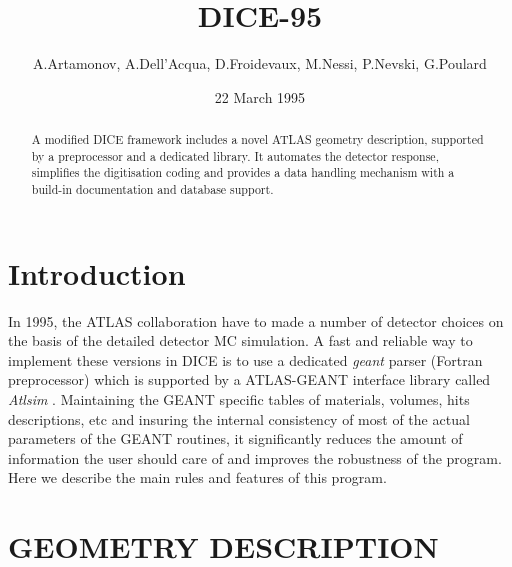 \setlength{\unitlength}{1cm}
\newcommand  {\g}  {{\it geant     }}
\newcommand  {\as} {{\it Atlsim    }}
\newcommand  {\asi} {{\it Atlsim } interface }
\newcommand  {\s}  {$ \Rightarrow $}
\newcommand  {\p}  {\put}
\newcommand  {\mup}{\multiput}
\newcommand  {\f}  {\framebox}
\newcommand  {\m}  {\makebox}
\renewcommand{\l}  {\line}
\renewcommand{\v}  {\vector}
\newcommand  {\bp} {\begin{picture}}
\newcommand  {\ep} {\end{picture}}


 
\date{22 March 1995}
\title{DICE-95}
\author{A.Artamonov, A.Dell'Acqua, D.Froidevaux, M.Nessi, P.Nevski, G.Poulard}
\maketitle
 
\begin{abstract}
A modified DICE framework 
includes a novel ATLAS geometry description, 
supported by a preprocessor and a dedicated library.
It automates the detector response,
simplifies the digitisation coding 
and provides a data handling mechanism 
with a build-in documentation and database support.
\end{abstract}
 

\section{Introduction}
 
 In 1995, the ATLAS collaboration have to made 
a number of detector choices on the basis of  
the detailed detector MC simulation.
  A fast and reliable way to implement these versions in DICE
is to use a dedicated \g parser (Fortran preprocessor) 
which is supported by a
ATLAS-GEANT interface library called \as. 
  Maintaining the GEANT specific tables of 
materials, volumes,  hits descriptions, etc 
and insuring the internal consistency of most of
the actual parameters of the GEANT routines,
 it significantly reduces the amount of information
the user should care of 
and improves  the robustness of the program.
 Here we describe the main rules and  features of this program.
 
\section{GEOMETRY DESCRIPTION}
 
